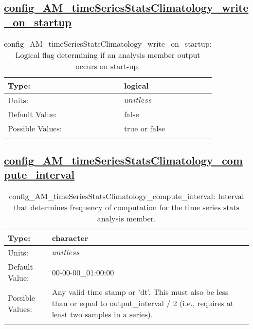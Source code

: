 \subsection[config\_AM\_timeSeriesStatsClimatology\_write\_on\_startup]{\hyperref[sec:nm_tab_AM_timeSeriesStatsClimatology]{config\_AM\_timeSeriesStatsClimatology\_write\_on\_startup}}
\label{subsec:nm_sec_config_AM_timeSeriesStatsClimatology_write_on_startup}
\begin{center}
\begin{longtable}{| p{2.0in} || p{4.0in} |}
    \hline
    Type: & logical \\
    \hline
    Units: & $unitless$ \\
    \hline
    Default Value: & false \\
    \hline
    Possible Values: & true or false \\
    \hline
    \caption{config\_AM\_timeSeriesStatsClimatology\_write\_on\_startup: Logical flag determining if an analysis member output occurs on start-up.}
\end{longtable}
\end{center}
\subsection[config\_AM\_timeSeriesStatsClimatology\_compute\_interval]{\hyperref[sec:nm_tab_AM_timeSeriesStatsClimatology]{config\_AM\_timeSeriesStatsClimatology\_compute\_interval}}
\label{subsec:nm_sec_config_AM_timeSeriesStatsClimatology_compute_interval}
\begin{center}
\begin{longtable}{| p{2.0in} || p{4.0in} |}
    \hline
    Type: & character \\
    \hline
    Units: & $unitless$ \\
    \hline
    Default Value: & 00-00-00\_01:00:00 \\
    \hline
    Possible Values: & Any valid time stamp or 'dt'. This must also be less than or equal to output\_interval / 2 (i.e., requires at least two samples in a series). \\
    \hline
    \caption{config\_AM\_timeSeriesStatsClimatology\_compute\_interval: Interval that determines frequency of computation for the time series stats analysis member.}
\end{longtable}
\end{center}
